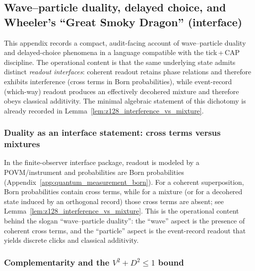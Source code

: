 \subsection{Wave--particle duality, delayed choice, and Wheeler's ``Great Smoky Dragon'' (interface)}
\label{app:wave_particle_delayed_choice}

This appendix records a compact, audit-facing account of wave--particle duality and delayed-choice phenomena in a language compatible with the tick\,+\,CAP discipline.
The operational content is that the same underlying state admits distinct \emph{readout interfaces}:
coherent readout retains phase relations and therefore exhibits interference (cross terms in Born probabilities),
while event-record (which-way) readout produces an effectively decohered mixture and therefore obeys classical additivity.
The minimal algebraic statement of this dichotomy is already recorded in Lemma~\ref{lem:z128_interference_vs_mixture}.

\subsubsection{Duality as an interface statement: cross terms versus mixtures}
\label{subsec:dual_as_interface}

In the finite-observer interface package, readout is modeled by a POVM/instrument and probabilities are Born probabilities (Appendix~\ref{app:quantum_measurement_born}).
For a coherent superposition, Born probabilities contain cross terms, while for a mixture (or for a decohered state induced by an orthogonal record) those cross terms are absent; see Lemma~\ref{lem:z128_interference_vs_mixture}.
This is the operational content behind the slogan ``wave--particle duality'': the ``wave'' aspect is the presence of coherent cross terms, and the ``particle'' aspect is the event-record readout that yields discrete clicks and classical additivity.

\subsubsection{Complementarity and the \texorpdfstring{$V^2+D^2\le 1$}{V^2+D^2<=1} bound}
\label{subsec:engert_bound}

